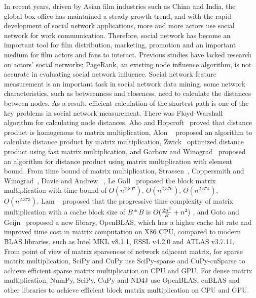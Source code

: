 \documentclass[review]{cvpr}
\begin{document}
In recent years, driven by Asian film industries such as China and India, the global box office has maintained a steady growth trend, and with the rapid development of social network applications, more and more actors use social network for work communication.
Therefore, social network has become an important tool for film distribution, marketing, promotion and an important medium for film actors and fans to interact.
Previous studies have lacked research on actors' social networks; PageRank, an existing node influence algorithm, is not accurate in evaluating social network influence.
Social network feature measurement is an important task in social network data mining, some network characteristics, such as betweenness and closeness, need to calculate the distances between nodes.
As a result, efficient calculation of the shortest path is one of the key problems in social network measurement.
There was Floyd-Warshall~\cite{floyd1962algorithm,warshall1962theorem} algorithm for calculating node distances, Aho and Hopcroft~\cite{aho1974design} proved that distance product is homogenous to matrix multiplication,
Alon \etal ~\cite{alon1997exponent} proposed an algorithm to calculate distance product by matrix multiplication, Zwick~\cite{zwick2002all} optimized distance product using fast matrix multiplication,
and Garbow and Winograd~\cite{garbow1985scaling} proposed an algorithm for distance product using matrix multiplication with element bound.
From time bound of matrix multiplication, Strassen~\cite{strassen1969gaussian}, Coppersmith and Winograd~\cite{coppersmith1987matrix}, Davie and Andrew ~\cite{davie2013improved}, Le Gall~\cite{le2014powers} proposed the block matrix multiplication with time bound of \(O(n ^ {2.807})\), \(O(n^{2.376})\), \(O(n^{2.374})\), \(O(n^{2.373})\).
Lam \etal ~\cite{lam1991cache} proposed that the progressive time complexity of matrix multiplication with a cache block size of $B*B$ is \(O({2n^3 \over B}+{n^2})\) ,
and Goto and Geijn~\cite{goto2008anatomy} proposed a new library, OpenBLAS, which has a higher cache hit rate and improved time cost in matrix computation on X86 CPU, compared to modern BLAS libraries, such as Intel MKL v8.1.1, ESSL v4.2.0 and ATLAS v3.7.11.
From point of view of matrix sparseness of network adjacent matrix, for sparse matrix multiplication, SciPy  and CuPy  use SciPy-sparse and CuPy-cuSparse to achieve efficient sparse matrix multiplication on CPU and GPU.
For dense matrix multiplication, NumPy, SciPy, CuPy and ND4J use OpenBLAS, cuBLAS and other libraries to achieve efficient block matrix multiplication on CPU and GPU.
\end{document}
